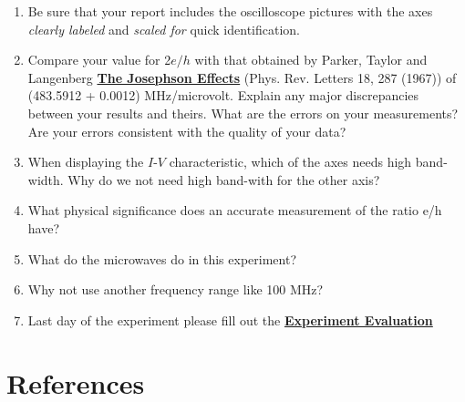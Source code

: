 \documentclass{../lab}
\begin{document}
\begin{enumerate}
    \item Be sure that your report includes the oscilloscope pictures with the axes \emph{clearly labeled} and \emph{scaled for} quick identification.

    \item Compare your value for 2$e/h$ with that obtained by Parker, Taylor and Langenberg \href{http://physics111.lib.berkeley.edu/Physics111/Reprints/JOS/04-The\_Josephson\_Effects.pdf}{\textbf{The Josephson Effects}} (Phys. Rev. Letters 18, 287 (1967)) of (483.5912 + 0.0012) MHz/microvolt. Explain any major discrepancies between your results and theirs. What are the errors on your measurements? Are your errors consistent with the quality of your data?

    \item When displaying the $I$-$V$ characteristic, which of the axes needs high band-width. Why do we not need high band-with for the other axis?

    \item What physical significance does an accurate measurement of the ratio e/h have?

    \item What do the microwaves do in this experiment?

    \item Why not use another frequency range like 100 MHz?

    \item Last day of the experiment please fill out the \href{\ExperimentEvaluation}{\textbf{Experiment Evaluation}}

\end{enumerate}

\section{References}
\label{sec:References}
\end{document}
